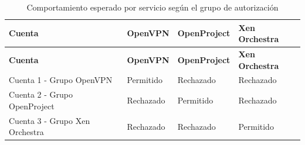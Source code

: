 \begingroup
\fontsize{8.5pt}{9.5pt}\selectfont
\renewcommand{\arraystretch}{1.3}
\setlength{\tabcolsep}{4pt}

\begin{longtable}{|
	>{\raggedright\arraybackslash}p{4.5cm}|
	>{\raggedright\arraybackslash}p{3.0cm}|
	>{\raggedright\arraybackslash}p{3.0cm}|
	>{\raggedright\arraybackslash}p{3.0cm}|}

	\caption{Comportamiento esperado por servicio según el grupo de autorización}
	\label{tab:pt02-comportamiento-esperado}
	\\
	\hline
	\tableheader
	\textbf{Cuenta}                &
	\textbf{OpenVPN}               &
	\textbf{OpenProject}           &
	\textbf{Xen Orchestra}
	\\
	\hline
	\endfirsthead

	\hline
	\tableheader
	\textbf{Cuenta}                &
	\textbf{OpenVPN}               &
	\textbf{OpenProject}           &
	\textbf{Xen Orchestra}
	\\
	\hline
	\endhead

	Cuenta 1 - Grupo OpenVPN       & Permitido & Rechazado & Rechazado \\ \hline
	Cuenta 2 - Grupo OpenProject   & Rechazado & Permitido & Rechazado \\ \hline
	Cuenta 3 - Grupo Xen Orchestra & Rechazado & Rechazado & Permitido \\ \hline
\end{longtable}
\endgroup
\normalsize
